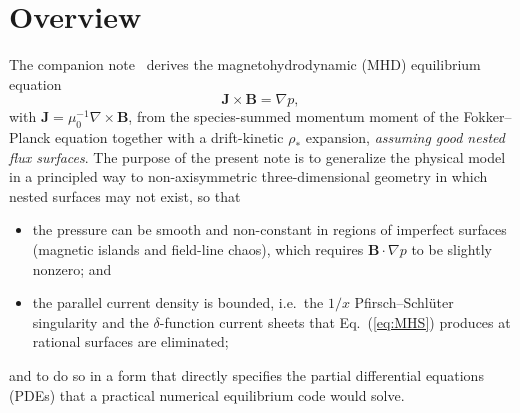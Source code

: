 \documentclass[english]{article}
\newcommand{\bB}{\mathbf{B}}
\newcommand{\bJ}{\mathbf{J}}
\begin{document}
\begin{abstract}
result is a closed elliptic/hypoelliptic system of partial differential equations for
$(\bB,p,u=J_\parallel/B)$, bordered by one one-dimensional unknown and one one-dimensional
constraint, that is suitable as the basis of a practical three-dimensional equilibrium code, reduces to the classical model (and to Grad--Shafranov plus one-dimensional transport) when
nested surfaces exist, and reduces to stepped-pressure states in the vanishing-transport limit.
Alongside the predictive form of the model, in which a heating deposition is prescribed and the
profile is an output, we give an interpretive form suited to the classical workflow: a
one-dimensional pressure profile $p_0(s)$, specified as a function of normalized enclosed volume,
is realized exactly
by composing it with the level-set volume function of a reference potential that solves the same
anisotropic transport equation---requiring neither a heating source nor any tuning parameter,
while preserving the small parallel pressure gradient, island flattening, and barrier-localized
structure that the transport operator enforces.
We give the model equations, boundary conditions, input functions, an iteration scheme, recovery
checks against known analytic limits, and the relation to existing approaches
(VMEC, PIES, HINT, SPEC/MRxMHD, SIESTA, the stochastic-equilibrium analysis of
Krommes and Reiman, and the statistical equilibrium model of Ruth, Burby, Sengupta, and Brown).
\end{abstract}

\section{Overview}
\label{sec:overview}

The companion note~\cite{landreman_note} derives the magnetohydrodynamic (MHD) equilibrium
equation
\begin{equation}
\bJ\times\bB=\nabla p,
\label{eq:MHS}
\end{equation}
with $\bJ=\mu_0^{-1}\nabla\times\bB$, from the species-summed momentum moment of the
Fokker--Planck equation together with a drift-kinetic $\rho_*$ expansion, \emph{assuming good
nested flux surfaces}. The purpose of the present note is to generalize the physical model in a
principled way to non-axisymmetric three-dimensional geometry in which nested surfaces may not
exist, so that
\begin{itemize}
\item the pressure can be smooth and non-constant in regions of imperfect surfaces (magnetic
islands and field-line chaos), which requires $\bB\cdot\nabla p$ to be slightly nonzero; and
\item the parallel current density is bounded, i.e.\ the $1/x$ Pfirsch--Schl\"uter singularity and
the $\delta$-function current sheets that Eq.~(\ref{eq:MHS}) produces at rational surfaces
\cite{newcomb1959,boozer1981,cary1985,loizu2015a} are eliminated;
\end{itemize}
and to do so in a form that directly specifies the partial differential equations (PDEs) that a
practical numerical equilibrium code would solve.
\end{document}
